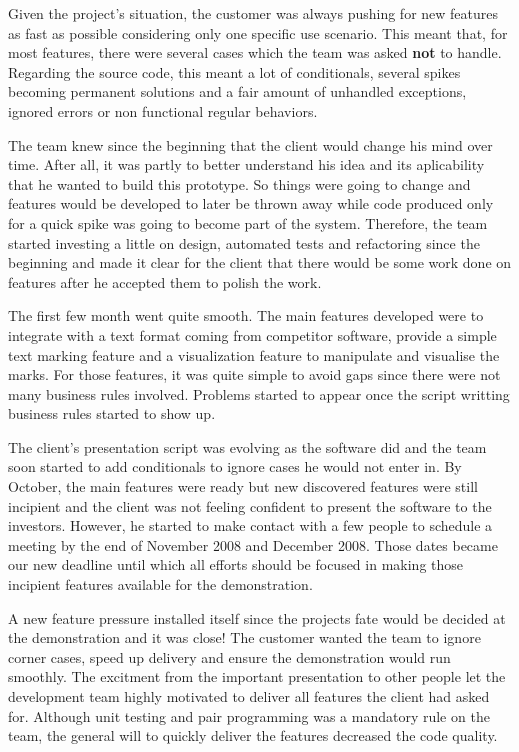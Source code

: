\documentclass[lnbip]{svmultln}
\begin{document}
Given the project's situation, the customer was always pushing for new
features as fast as possible considering only one specific use
scenario. This meant that, for most features, there were several cases
which the team was asked \textbf{not} to handle. Regarding the source
code, this meant a lot of conditionals, several spikes becoming
permanent solutions and a fair amount of unhandled exceptions, ignored
errors or non functional regular behaviors.

The team knew since the beginning that the client would change his
mind over time. After all, it was partly to better understand his idea
and its aplicability that he wanted to build this prototype. So things
were going to change and features would be developed to later be
thrown away while code produced only for a quick spike was going to
become part of the system. Therefore, the team started investing a
little on design, automated tests and refactoring since the beginning
and made it clear for the client that there would be some work done on
features after he accepted them to polish the work.

The first few month went quite smooth. The main features developed
were to integrate with a text format coming from competitor software,
provide a simple text marking feature and a visualization feature to
manipulate and visualise the marks. For those features, it was quite
simple to avoid gaps since there were not many business rules
involved. Problems started to appear once the script writting business
rules started to show up.

The client's presentation script was evolving as the software did and
the team soon started to add conditionals to ignore cases he would not
enter in. By October, the main features were ready but new discovered
features were still incipient and the client was not feeling confident
to present the software to the investors. However, he started to make
contact with a few people to schedule a meeting by the end of November
2008 and December 2008. Those dates became our new deadline until
which all efforts should be focused in making those incipient features
available for the demonstration.

A new feature pressure installed itself since the projects fate would
be decided at the demonstration and it was close! The customer wanted
the team to ignore corner cases, speed up delivery and ensure the
demonstration would run smoothly. The excitment from the important
presentation to other people let the development team highly motivated
to deliver all features the client had asked for. Although unit
testing and pair programming was a mandatory rule on the team, the
general will to quickly deliver the features decreased the code
quality.
\end{document}
